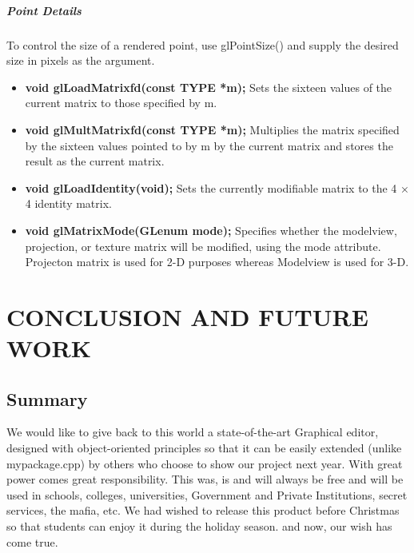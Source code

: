 \documentclass[12pt]{report}
\begin{document}
\paragraph{\textbf{Point Details} } 
To control the size of a rendered point, use glPointSize() and supply the desired size in pixels as the argument.
\begin{itemize}
\item{}	\textbf{void glLoadMatrix{fd}(const TYPE *m);}
Sets the sixteen values of the current matrix to those specified by m.

\item{}	\textbf{void glMultMatrix{fd}(const TYPE *m);}
Multiplies the matrix specified by the sixteen values pointed to by m by the current matrix and stores the result as the current matrix.

\item{}	\textbf{void glLoadIdentity(void);}
Sets the currently modifiable matrix to the 4 × 4 identity matrix.

\item{}	\textbf{void glMatrixMode(GLenum mode);}
Specifies whether the modelview, projection, or texture matrix will be modified, using the mode attribute. Projecton matrix is used for 2-D purposes whereas Modelview is used for 3-D.

\end{itemize}

\pagestyle{fancy}
\chead{}
\rfoot{\small{\thepage}}
\renewcommand{\headrulewidth}{0.4pt}
\renewcommand{\footrulewidth}{0.4pt}
\chapter{CONCLUSION AND FUTURE WORK}

\section{Summary}
We would like to give back to this world a state-of-the-art Graphical editor, designed with object-oriented principles so that it can be easily extended (unlike mypackage.cpp) by others who choose to show our project next year. With great power comes great responsibility. This was, is and will always be free and will be used in schools, colleges, universities, Government and Private Institutions, secret services, the mafia, etc. We had wished to release this product before Christmas so that students can enjoy it during the holiday season. and now, our wish has come true.
\end{document}
